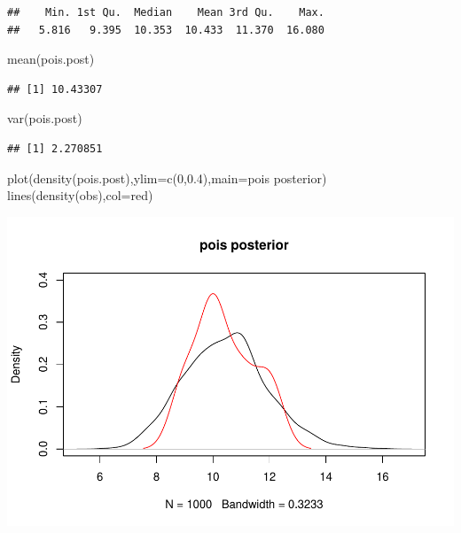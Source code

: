 \documentclass[
]{book}
\newenvironment{Shaded}{\begin{snugshade}}{\end{snugshade}}
\newcommand{\AttributeTok}[1]{\textcolor[rgb]{0.77,0.63,0.00}{#1}}
\newcommand{\DecValTok}[1]{\textcolor[rgb]{0.00,0.00,0.81}{#1}}
\newcommand{\FloatTok}[1]{\textcolor[rgb]{0.00,0.00,0.81}{#1}}
\newcommand{\FunctionTok}[1]{\textcolor[rgb]{0.00,0.00,0.00}{#1}}
\newcommand{\NormalTok}[1]{#1}
\newcommand{\StringTok}[1]{\textcolor[rgb]{0.31,0.60,0.02}{#1}}
\theoremstyle{definition}
\theoremstyle{definition}
\theoremstyle{definition}
\theoremstyle{definition}
\theoremstyle{remark}
\begin{document}
\begin{verbatim}
##    Min. 1st Qu.  Median    Mean 3rd Qu.    Max. 
##   5.816   9.395  10.353  10.433  11.370  16.080
\end{verbatim}

\begin{Shaded}
\begin{Highlighting}[]
  \FunctionTok{mean}\NormalTok{(pois.post)}
\end{Highlighting}
\end{Shaded}

\begin{verbatim}
## [1] 10.43307
\end{verbatim}

\begin{Shaded}
\begin{Highlighting}[]
  \FunctionTok{var}\NormalTok{(pois.post)}
\end{Highlighting}
\end{Shaded}

\begin{verbatim}
## [1] 2.270851
\end{verbatim}

\begin{Shaded}
\begin{Highlighting}[]
  \FunctionTok{plot}\NormalTok{(}\FunctionTok{density}\NormalTok{(pois.post),}\AttributeTok{ylim=}\FunctionTok{c}\NormalTok{(}\DecValTok{0}\NormalTok{,}\FloatTok{0.4}\NormalTok{),}\AttributeTok{main=}\StringTok{\textquotesingle{}pois posterior\textquotesingle{}}\NormalTok{)}
  \FunctionTok{lines}\NormalTok{(}\FunctionTok{density}\NormalTok{(obs),}\AttributeTok{col=}\StringTok{\textquotesingle{}red\textquotesingle{}}\NormalTok{)}
\end{Highlighting}
\end{Shaded}

\includegraphics{_main_files/figure-latex/unnamed-chunk-39-2.pdf}
\end{document}
